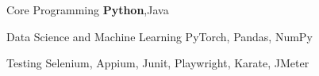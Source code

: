 
\begin{cvskills}
  \cvskill
    {Core Programming} %
    {\textbf{Python},\space Java}


  \cvskill
    {Data Science and Machine Learning} %
    {PyTorch, \space  Pandas,  \space NumPy}
    
  \cvskill
    {Testing} %
    {\space Selenium, \space Appium, \space Junit, \space Playwright, Karate, JMeter}

\end{cvskills}




